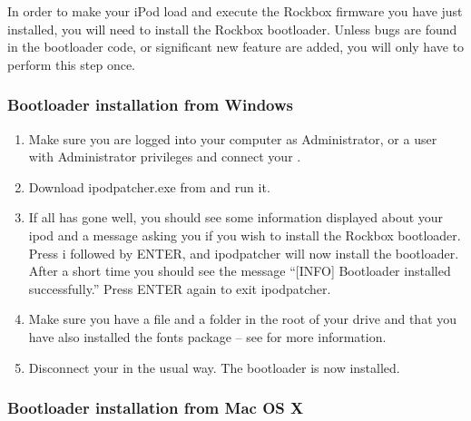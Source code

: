 

In order to make your iPod load and execute the Rockbox firmware you
have just installed, you will need to install the Rockbox
bootloader. Unless bugs are found in the bootloader code, or
significant new feature are added, you will only have to perform this
step once.

\subsubsection{Bootloader installation from Windows}

\begin{enumerate}

\item Make sure you are logged into your computer as Administrator, or a 
user with Administrator privileges and connect your \dap{}.

\item Download ipodpatcher.exe from 
and run it.

\item If all has gone well, you should see some information displayed about
your ipod and a message asking you if you wish to install the Rockbox
bootloader. Press i followed by ENTER, and ipodpatcher will now
install the bootloader. After a short time you should see the message
``[INFO] Bootloader installed successfully.'' Press ENTER again to exit
ipodpatcher.

\item Make sure you have a  file and a 
 folder in the 
root of your \daps{} drive and that you have also installed the fonts
package -- see  for more information.

\item Disconnect your \dap{} in the usual way. The bootloader is now installed. 

\end{enumerate}

\subsubsection{Bootloader installation from Mac OS X}

